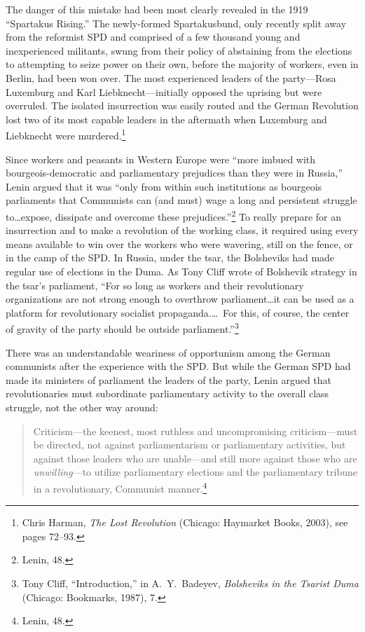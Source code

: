 The danger of this mistake had been most clearly revealed in the 1919 ``Spartakus Rising.'' The newly-formed Spartakusbund, only recently split away from the reformist SPD and comprised of a few thousand young and inexperienced militants, swung from their policy of abstaining from the elections to attempting to seize power on their own, before the majority of workers, even in Berlin, had been won over. The most experienced leaders of the party---Rosa Luxemburg and Karl Liebknecht---initially opposed the uprising but were overruled. The isolated insurrection was easily routed and the German Revolution lost two of its most capable leaders in the aftermath when Luxemburg and Liebknecht were murdered.\footnote{Chris Harman, \emph{The Lost Revolution} (Chicago: Haymarket Books, 2003), see pages 72--93.}

Since workers and peasants in Western Europe were ``more imbued with bourgeois-democratic and parliamentary prejudices than they were in Russia,'' Lenin argued that it was ``only from within such institutions as bourgeois parliaments that Communists can (and must) wage a long and persistent struggle to\ldots expose, dissipate and overcome these prejudices.''\footnote{Lenin, 48.} To really prepare for an insurrection and to make a revolution of the working class, it required using every means available to win over the workers who were wavering, still on the fence, or in the camp of the SPD. In Russia, under the tsar, the Bolsheviks had made regular use of elections in the Duma. As Tony Cliff wrote of Bolshevik strategy in the tsar's parliament, ``For so long as workers and their revolutionary organizations are not strong enough to overthrow parliament\ldots it can be used as a platform for revolutionary socialist propaganda.\ldots\ For this, of course, the center of gravity of the party should be outside parliament.''\footnote{Tony Cliff, ``Introduction,'' in A.\ Y.\ Badeyev, \emph{Bolsheviks in the Tsarist Duma} (Chicago: Bookmarks, 1987), 7.}

There was an understandable weariness of opportunism among the German communists after the experience with the SPD. But while the German SPD had made its ministers of parliament the leaders of the party, Lenin argued that revolutionaries must subordinate parliamentary activity to the overall class struggle, not the other way around:

\blockquote{Criticism---the keenest, most ruthless and uncompromising criticism---must be directed, not against parliamentarism or parliamentary activities, but against those leaders who are unable---and still more against those who are \emph{unwilling}---to utilize parliamentary elections and the parliamentary tribune in a revolutionary, Communist manner.\footnote{Lenin, 48.}}

